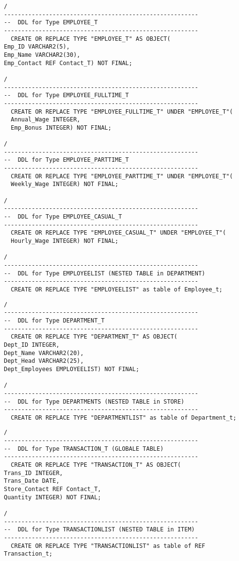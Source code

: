 \documentclass{scrartcl}
\begin{document}
\begin{lstlisting}
/
--------------------------------------------------------
--  DDL for Type EMPLOYEE_T
--------------------------------------------------------
  CREATE OR REPLACE TYPE "EMPLOYEE_T" AS OBJECT(
Emp_ID VARCHAR2(5),
Emp_Name VARCHAR2(30),
Emp_Contact REF Contact_T) NOT FINAL;

/
--------------------------------------------------------
--  DDL for Type EMPLOYEE_FULLTIME_T
--------------------------------------------------------
  CREATE OR REPLACE TYPE "EMPLOYEE_FULLTIME_T" UNDER "EMPLOYEE_T"(
  Annual_Wage INTEGER,
  Emp_Bonus INTEGER) NOT FINAL;
  
/
--------------------------------------------------------
--  DDL for Type EMPLOYEE_PARTTIME_T
--------------------------------------------------------
  CREATE OR REPLACE TYPE "EMPLOYEE_PARTTIME_T" UNDER "EMPLOYEE_T"(
  Weekly_Wage INTEGER) NOT FINAL;
  
/
--------------------------------------------------------
--  DDL for Type EMPLOYEE_CASUAL_T
--------------------------------------------------------
  CREATE OR REPLACE TYPE "EMPLOYEE_CASUAL_T" UNDER "EMPLOYEE_T"(
  Hourly_Wage INTEGER) NOT FINAL;

/
--------------------------------------------------------
--  DDL for Type EMPLOYEELIST (NESTED TABLE in DEPARTMENT)
--------------------------------------------------------
  CREATE OR REPLACE TYPE "EMPLOYEELIST" as table of Employee_t;
\end{lstlisting}

\begin{lstlisting}
/
--------------------------------------------------------
--  DDL for Type DEPARTMENT_T
--------------------------------------------------------
  CREATE OR REPLACE TYPE "DEPARTMENT_T" AS OBJECT(
Dept_ID INTEGER,
Dept_Name VARCHAR2(20),
Dept_Head VARCHAR2(25),
Dept_Employees EMPLOYEELIST) NOT FINAL;

/
--------------------------------------------------------
--  DDL for Type DEPARTMENTS (NESTED TABLE in STORE)
--------------------------------------------------------
  CREATE OR REPLACE TYPE "DEPARTMENTLIST" as table of Department_t;
\end{lstlisting}

\begin{lstlisting}
/
--------------------------------------------------------
--  DDL for Type TRANSACTION_T (GLOBALE TABLE)
--------------------------------------------------------
  CREATE OR REPLACE TYPE "TRANSACTION_T" AS OBJECT(
Trans_ID INTEGER,
Trans_Date DATE,
Store_Contact REF Contact_T,
Quantity INTEGER) NOT FINAL;

/
--------------------------------------------------------
--  DDL for Type TRANSACTIONLIST (NESTED TABLE in ITEM)
--------------------------------------------------------
  CREATE OR REPLACE TYPE "TRANSACTIONLIST" as table of REF Transaction_t;
\end{lstlisting}
\end{document}
